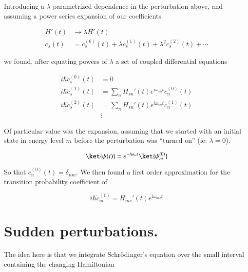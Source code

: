 Introducing a $\lambda$ parametrized dependence in the perturbation above, and assuming a power series expansion of our coefficients

\begin{equation}\label{eqn:qmTwoReview:490}
\boxed{
\begin{aligned}
H'(t) &\rightarrow \lambda H'(t) \\
c_s(t) &= c_s^{(0)}(t) + \lambda c_s^{(1)}(t) + \lambda^2 c_s^{(2)}(t) + \cdots
\end{aligned}
}
\end{equation}

we found, after equating powers of $\lambda$ a set of coupled differential equations

\begin{equation}\label{eqn:qmTwoReview:510}
\begin{aligned}
i \hbar \dot{c}_s^{(0)}(t) &= 0  \\
i \hbar \dot{c}_s^{(1)}(t) &= \sum_{n} H_{sn}'(t) e^{i \omega_{sn} t} c_n^{(0)}(t) \\
i \hbar \dot{c}_s^{(2)}(t) &= \sum_{n} H_{sn}'(t) e^{i \omega_{sn} t} c_n^{(1)}(t) \\
&\vdots
\end{aligned}
\end{equation}

Of particular value was the expansion, assuming that we started with an initial state in energy level $m$ before the perturbation was ``turned on'' (ie: $\lambda = 0$).

\begin{equation}\label{eqn:qmTwoReview:530}
\ket{\psi(t)} = e^{-i \omega_m t} \ket{\psi_m^{(0)} }
\end{equation}

So that $c_n^{(0)}(t) = \delta_{nm}$.  We then found a first order approximation for the transition probability coefficient of

\begin{equation}\label{eqn:qmTwoReview:550}
\boxed{
i \hbar \dot{c}_m^{(1)} = H_{ms}'(t) e^{i \omega_{ms} t}
}
\end{equation}

\section{Sudden perturbations.}

The idea here is that we integrate Schr\"{o}dinger's equation over the small interval containing the changing Hamiltonian

